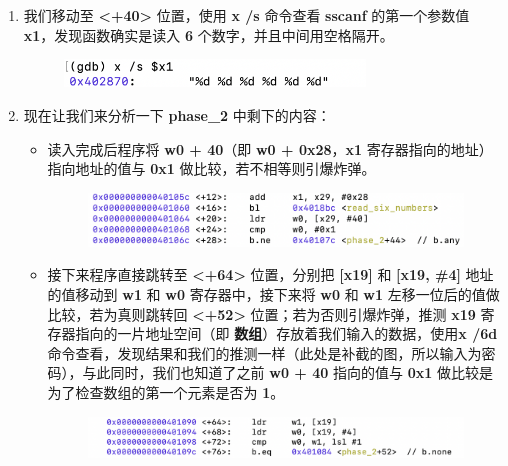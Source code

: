 \begin{enumerate}
\begin{figure}[htbp]
                \end{figure}
            \newpage
            \item 我们移动至 \textbf{<+40>} 位置，使用 \textbf{x /s } 命令查看 \textbf{sscanf} 的第一个参数值 \textbf{x1}，发现函数确实是读入 \textbf{6} 个数字，并且中间用空格隔开。
                \begin{figure}[htbp]
                    \hspace*{2cm}
                    \includegraphics*[width = 8cm]{s2_2.png}
                \end{figure}
            \item 现在让我们来分析一下 \textbf{phase\_2} 中剩下的内容：
                \begin{itemize}
                    \item 读入完成后程序将 \textbf{w0 + 40}（即 \textbf{w0 + 0x28}，\textbf{x1} 寄存器指向的地址） 指向地址的值与 \textbf{0x1} 做比较，若不相等则引爆炸弹。
                        \begin{figure}[htbp]
                            \hspace*{1.5cm}
                            \includegraphics*[width = 11cm]{s2_3.png} 
                        \end{figure}
                    \item 接下来程序直接跳转至 \textbf{<+64>} 位置，分别把 \textbf{[x19]} 和 \textbf{[x19, \#4]} 地址的值移动到 \textbf{w1} 和 \textbf{w0} 寄存器中，接下来将 \textbf{w0} 和 \textbf{w1} 左移一位后的值做比较，若为真则跳转回 \textbf{<+52>} 位置；若为否则引爆炸弹，推测 \textbf{x19} 寄存器指向的一片地址空间（即 \textbf{数组}）存放着我们输入的数据，使用\textbf{x /6d } 命令查看，发现结果和我们的推测一样（此处是补截的图，所以输入为密码），与此同时，我们也知道了之前 \textbf{w0 + 40} 指向的值与 \textbf{0x1} 做比较是为了检查数组的第一个元素是否为 \textbf{1}。
                        \begin{figure}[htbp]
                            \hspace*{1.5cm}
                            \includegraphics*[width = 11cm]{s2_4.png} \\ 

\end{figure}
\end{itemize}
\end{enumerate}
